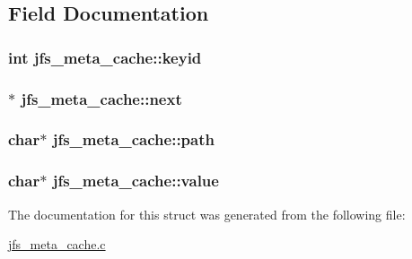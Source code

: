 \subsection{Field Documentation}
\hypertarget{structjfs__meta__cache_a0005293570ac16fd711fc871f3b1862c}{
\subsubsection[{keyid}]{\setlength{\rightskip}{0pt plus 5cm}int {\bf jfs\_\-meta\_\-cache::keyid}}}
\label{structjfs__meta__cache_a0005293570ac16fd711fc871f3b1862c}
\hypertarget{structjfs__meta__cache_ae64f1523b58a1a2a72c895a9edcf6491}{
\subsubsection[{next}]{$\ast$ {\bf jfs\_\-meta\_\-cache::next}}}
\label{structjfs__meta__cache_ae64f1523b58a1a2a72c895a9edcf6491}
\hypertarget{structjfs__meta__cache_a2f1b7ec8936cfaa489936ecc024a586b}{
\subsubsection[{path}]{\setlength{\rightskip}{0pt plus 5cm}char$\ast$ {\bf jfs\_\-meta\_\-cache::path}}}
\label{structjfs__meta__cache_a2f1b7ec8936cfaa489936ecc024a586b}
\hypertarget{structjfs__meta__cache_a79baf964da5fc55ed18c7f925c47fab6}{
\subsubsection[{value}]{\setlength{\rightskip}{0pt plus 5cm}char$\ast$ {\bf jfs\_\-meta\_\-cache::value}}}
\label{structjfs__meta__cache_a79baf964da5fc55ed18c7f925c47fab6}


The documentation for this struct was generated from the following file:\begin{DoxyCompactItemize}
\item 
\hyperlink{jfs__meta__cache_8c}{jfs\_\-meta\_\-cache.c}\end{DoxyCompactItemize}
